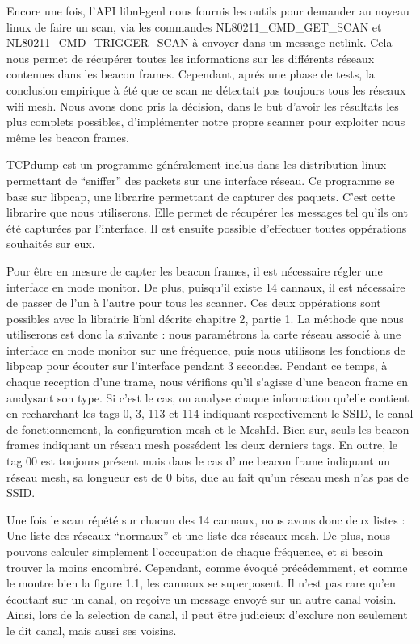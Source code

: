 Encore une fois, l'API libnl-genl nous fournis les outils pour demander au noyeau linux de faire un scan, via les commandes
NL80211\_CMD\_GET\_SCAN et NL80211\_CMD\_TRIGGER\_SCAN à envoyer dans un message netlink. Cela nous permet de récupérer toutes les
informations sur les différents réseaux contenues dans les beacon frames. Cependant, aprés une phase de tests, la conclusion 
empirique à été que ce scan ne détectait pas toujours tous les réseaux wifi mesh. Nous avons donc pris la décision, dans le but
d'avoir les résultats les plus complets possibles, d'implémenter notre propre scanner pour exploiter nous même les beacon frames.

TCPdump est un programme généralement inclus dans les distribution linux permettant de ``sniffer'' des packets sur une interface
réseau. Ce programme se base sur libpcap\cite{SCANlib}, une librarire permettant de capturer des paquets. C'est cette librarire que
nous utiliserons. Elle permet de récupérer les messages tel qu'ils ont été capturées par l'interface. Il est ensuite possible
d'effectuer toutes oppérations souhaités sur eux.

Pour être en mesure de capter les beacon frames, il est nécessaire régler une interface en mode monitor. De plus, puisqu'il existe 14
cannaux, il est nécessaire de passer de l'un à l'autre pour tous les scanner. Ces deux oppérations sont possibles avec la librairie 
libnl décrite chapitre 2, partie 1. La méthode que nous utiliserons est donc la suivante : nous paramétrons la carte réseau associé à
une interface en mode monitor sur une fréquence, puis nous utilisons les fonctions de libpcap pour écouter sur l'interface pendant 3
secondes. Pendant ce temps, à chaque reception d'une trame, nous vérifions qu'il s'agisse d'une beacon frame en analysant son type.
Si c'est le cas, on analyse chaque information qu'elle contient en recharchant les tags 0, 3, 113 et 114 indiquant
respectivement le SSID, le canal de fonctionnement, la configuration mesh et le MeshId. Bien sur, seuls les beacon frames indiquant
un réseau mesh possédent les deux derniers tags. En outre, le tag 00 est toujours présent mais dans le cas d'une beacon frame 
indiquant un réseau mesh, sa longueur est de 0 bits, due au fait qu'un réseau mesh n'as pas de SSID.

Une fois le scan répété sur chacun des 14 cannaux, nous avons donc deux listes : Une liste des réseaux ``normaux'' et une liste des
réseaux mesh. De plus, nous pouvons calculer simplement l'occcupation de chaque fréquence, et si besoin trouver la moins encombré.
Cependant, comme évoqué précédemment, et comme le montre bien la figure 1.1, les cannaux se superposent. Il n'est pas rare qu'en
écoutant sur un canal, on reçoive un message envoyé sur un autre canal voisin. Ainsi, lors de la selection de canal, il peut être
judicieux d'exclure non seulement le dit canal, mais aussi ses voisins.